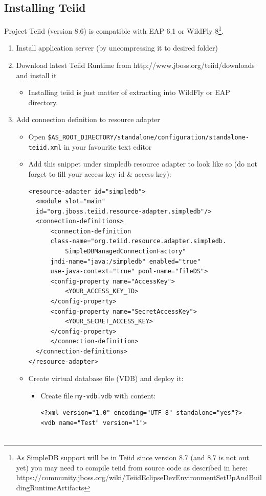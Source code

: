 \documentclass[oneside,12pt,final]{fithesis2}
\begin{document}
\subsection*{Installing Teiid}
Project Teiid (version 8.6) is compatible with EAP 6.1 or WildFly 8\footnote{As SimpleDB support will be in Teiid since version 8.7 (and 8.7 is not out yet) you may need to compile teiid from source code as described in here: https://community.jboss.org/wiki/TeiidEclipseDevEnvironmentSetUpAndBuildingRuntimeArtifacts}.

\begin{enumerate}
 \item Install application server (by uncompressing it to desired folder)
 \item Download latest Teiid Runtime from http://www.jboss.org/teiid/downloads and install it
 \begin{itemize}
  \item Installing teiid is just matter of extracting into WildFly or EAP directory.
 \end{itemize}
 \item Add connection definition to resource adapter
 \begin{itemize}
  \item Open \texttt{\$AS\_ROOT\_DIRECTORY/standalone/configuration/\allowbreak standalone-teiid.xml} in your favourite text editor
  \item Add this snippet under simpledb resource adapter to look like so (do not forget to fill your access key id \& access key):
  \begin{Verbatim}[fontsize=\small]
<resource-adapter id="simpledb">
  <module slot="main" 
  id="org.jboss.teiid.resource-adapter.simpledb"/>
  <connection-definitions>
      <connection-definition 
      class-name="org.teiid.resource.adapter.simpledb.
		  SimpleDBManagedConnectionFactory" 
      jndi-name="java:/simpledb" enabled="true" 
      use-java-context="true" pool-name="fileDS">
	  <config-property name="AccessKey">
	      <YOUR_ACCESS_KEY_ID>
	  </config-property>
	  <config-property name="SecretAccessKey">
	      <YOUR_SECRET_ACCESS_KEY>
	  </config-property>
      </connection-definition>
  </connection-definitions>
</resource-adapter>
  \end{Verbatim}
 \item Create virtual database file (VDB) and deploy it:
 \begin{itemize}
  \item Create file \texttt{my-vdb.vdb} with content:
  \begin{Verbatim}[fontsize=\small]
<?xml version="1.0" encoding="UTF-8" standalone="yes"?>
<vdb name="Test" version="1">


\end{Verbatim}
\end{itemize}
\end{itemize}
\end{enumerate}
\end{document}
